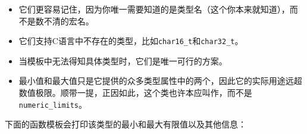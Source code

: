 \begin{itemize}
\item 它们更容易记住，因为你唯一需要知道的是类型名（这个你本来就知道），而不是数不清的宏名。


\item 它们支持C语言中不存在的类型，比如\texttt{char16\_\allowbreak{}t}和\texttt{char32\_\allowbreak{}t}。



\item 当模板中无法得知具体类型时，它们是唯一可行的方案。



\item 最小值和最大值只是它提供的众多类型属性中的两个，因此它的实际用途远超数值极限。顺带一提，正因如此，这个类也许本应叫作，而不是\texttt{numeric\_\allowbreak{}limits}。

\end{itemize}



下面的函数模板会打印该类型的最小和最大有限值以及其他信息：



